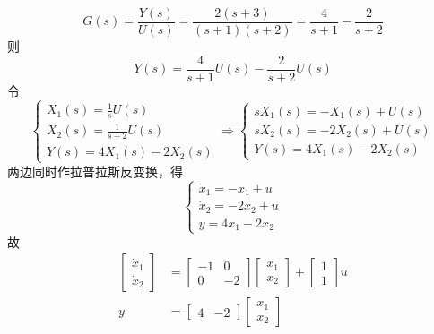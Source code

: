 \begin{exercise} %
    \begin{equation*}
        G(s) = \frac{Y(s)}{U(s)} = \frac{2(s+3)}{(s+1)(s+2)} = \frac{4}{s+1} - \frac{2}{s+2}
    \end{equation*}
    则
    \begin{equation*}
        Y(s) = \frac{4}{s+1}U(s) - \frac{2}{s+2}U(s)
    \end{equation*}
    令
    \begin{equation*}
        \begin{cases}
            X_1(s) = \frac{1}{s} U(s) \\
            X_2(s) = \frac{1}{s+2} U(s) \\
            Y(s) = 4X_1(s) - 2X_2(s)
        \end{cases} \Rightarrow \begin{cases}
            sX_1(s) = -X_1(s) + U(s) \\
            sX_2(s) = -2X_2(s) + U(s) \\
            Y(s) = 4X_1(s) - 2X_2(s)
        \end{cases}
    \end{equation*}
    两边同时作拉普拉斯反变换，得
    \begin{equation*}
        \begin{cases}
            \dot{x}_1 = -x_1 + u \\
            \dot{x}_2 = -2x_2 + u \\
            y = 4x_1 - 2x_2
        \end{cases}
    \end{equation*}
    故
    \begin{align*}
        \begin{bmatrix}
            \dot{x}_1 \\
            \dot{x}_2
        \end{bmatrix} &= \begin{bmatrix}
            -1 & 0 \\
            0 & -2 
        \end{bmatrix} \begin{bmatrix}
            x_1 \\
            x_2 
        \end{bmatrix} + \begin{bmatrix}
            1 \\
            1 
        \end{bmatrix} u \\
        y &= \begin{bmatrix}
            4 & -2 
        \end{bmatrix} \begin{bmatrix}
            x_1 \\
            x_2 
        \end{bmatrix}
    \end{align*}
\end{exercise}

